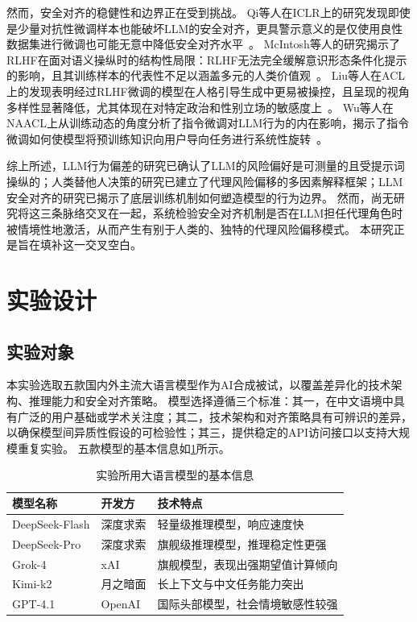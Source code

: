 \documentclass[journal]{vgtc}
\begin{document}
然而，安全对齐的稳健性和边界正在受到挑战。
Qi等人在ICLR上的研究发现即使是少量对抗性微调样本也能破坏LLM的安全对齐，更具警示意义的是仅使用良性数据集进行微调也可能无意中降低安全对齐水平~\cite{Qi2024Finetuning}。
McIntosh等人的研究揭示了RLHF在面对语义操纵时的结构性局限：RLHF无法完全缓解意识形态条件化提示的影响，且其训练样本的代表性不足以涵盖多元的人类价值观~\cite{McIntosh2024Inadequacy}。
Liu等人在ACL上的发现表明经过RLHF微调的模型在人格引导生成中更易被操控，且呈现的视角多样性显著降低，尤其体现在对特定政治和性别立场的敏感度上~\cite{Liu2024Evaluating}。
Wu等人在NAACL上从训练动态的角度分析了指令微调对LLM行为的内在影响，揭示了指令微调如何使模型将预训练知识向用户导向任务进行系统性旋转~\cite{Wu2024Language}。

综上所述，LLM行为偏差的研究已确认了LLM的风险偏好是可测量的且受提示词操纵的；人类替他人决策的研究已建立了代理风险偏移的多因素解释框架；LLM安全对齐的研究已揭示了底层训练机制如何塑造模型的行为边界。
然而，尚无研究将这三条脉络交叉在一起，系统检验安全对齐机制是否在LLM担任代理角色时被情境性地激活，从而产生有别于人类的、独特的代理风险偏移模式。
本研究正是旨在填补这一交叉空白。

\section{实验设计}

\subsection{实验对象}

本实验选取五款国内外主流大语言模型作为AI合成被试，以覆盖差异化的技术架构、推理能力和安全对齐策略。
模型选择遵循三个标准：其一，在中文语境中具有广泛的用户基础或学术关注度；其二，技术架构和对齐策略具有可辨识的差异，以确保模型间异质性假设的可检验性；其三，提供稳定的API访问接口以支持大规模重复实验。
五款模型的基本信息如\cref{tab:models}所示。

\begin{table}[tb]
  \caption{实验所用大语言模型的基本信息}
  \label{tab:models}
  \centering
  \footnotesize
  \setlength{\tabcolsep}{4pt}
  \begin{tabular}{p{0.68in}p{0.52in}p{1.8in}}
    \toprule
    模型名称 & 开发方 & 技术特点 \\
    \midrule
    DeepSeek-Flash & 深度求索 & 轻量级推理模型，响应速度快 \\
    DeepSeek-Pro & 深度求索 & 旗舰级推理模型，推理稳定性更强 \\
    Grok-4 & xAI & 旗舰模型，表现出强期望值计算倾向 \\
    Kimi-k2 & 月之暗面 & 长上下文与中文任务能力突出 \\
    GPT-4.1 & OpenAI & 国际头部模型，社会情境敏感性较强 \\
    \bottomrule
  \end{tabular}
\end{table}
\end{document}
